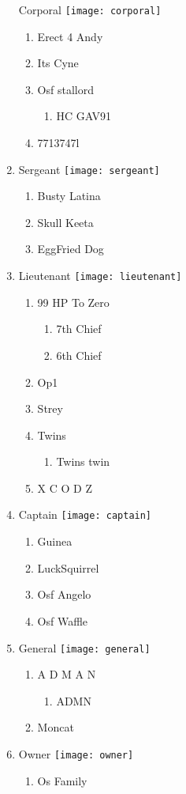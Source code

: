 \documentclass{article}
\begin{document}
\begin{enumerate}[I]
    Corporal \texttt{[image: corporal]}
    \begin{enumerate}[I]
      \item
	Erect 4 Andy
      \item
	Its Cyne
      \item
	Osf stallord
	\begin{enumerate}[I]
	  \item
	    HC GAV91
	\end{enumerate}
      \item
	7713747l
    \end{enumerate}
  \item
    Sergeant \texttt{[image: sergeant]}
    \begin{enumerate}[I]
      \item
	Busty Latina
      \item
	Skull Keeta
      \item
	EggFried Dog
    \end{enumerate}
  \item
    Lieutenant \texttt{[image: lieutenant]}
    \begin{enumerate}[I]
      \item 
	99 HP To Zero
	\begin{enumerate}[I]
	  \item
	    7th Chief
	  \item
	    6th Chief
	\end{enumerate}
      \item
	Op1
      \item
	Strey
      \item
	Twins
	  \begin{enumerate}[I]
	    \item
	      Twins twin
	  \end{enumerate}
      \item
	X C O D Z
    \end{enumerate}
  \item
    Captain \texttt{[image: captain]}
    \begin{enumerate}[I]
      \item
	Guinea
      \item
	LuckSquirrel
      \item
	Osf Angelo
      \item
	Osf Waffle
    \end{enumerate}
  \item
    General \texttt{[image: general]}
    \begin{enumerate}[I]
      \item
	A D M A N
	\begin{enumerate}[I]
	  \item
	    A\textunderscore D\textunderscore M\textunderscore N
	\end{enumerate}
      \item
	Moncat
    \end{enumerate}
  \item
    Owner \texttt{[image: owner]}
    \begin{enumerate}[I]
      \item
	Os Family
    \end{enumerate}
\end{enumerate}
\end{document}
